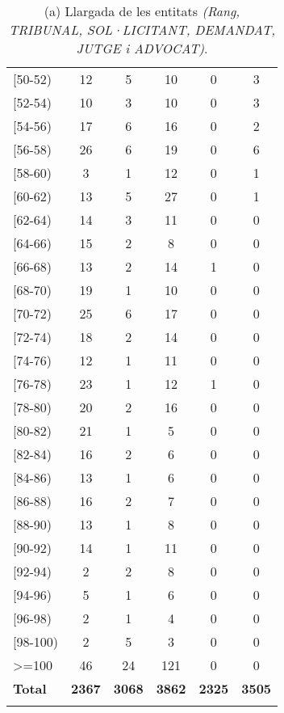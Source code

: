 \begin{table}[H]
\begin{tabular}{|l|ccccc}
  {[}50-52) & 12 & 5 & 10 & 0 & 3 \\
  {[}52-54) & 10 & 3 & 10 & 0 & 3 \\
  {[}54-56) & 17 & 6 & 16 & 0 & 2 \\
  {[}56-58) & 26 & 6 & 19 & 0 & 6 \\
  {[}58-60) & 3 & 1 & 12 & 0 & 1 \\
  {[}60-62) & 13 & 5 & 27 & 0 & 1 \\
  {[}62-64) & 14 & 3 & 11 & 0 & 0 \\
  {[}64-66) & 15 & 2 & 8 & 0 & 0 \\
  {[}66-68) & 13 & 2 & 14 & 1 & 0 \\
  {[}68-70) & 19 & 1 & 10 & 0 & 0 \\
  {[}70-72) & 25 & 6 & 17 & 0 & 0 \\
  {[}72-74) & 18 & 2 & 14 & 0 & 0 \\
  {[}74-76) & 12 & 1 & 11 & 0 & 0 \\
  {[}76-78) & 23 & 1 & 12 & 1 & 0 \\
  {[}78-80) & 20 & 2 & 16 & 0 & 0 \\
  {[}80-82) & 21 & 1 & 5 & 0 & 0 \\
  {[}82-84) & 16 & 2 & 6 & 0 & 0 \\
  {[}84-86) & 13 & 1 & 6 & 0 & 0 \\
  {[}86-88) & 16 & 2 & 7 & 0 & 0 \\
  {[}88-90) & 13 & 1 & 8 & 0 & 0 \\
  {[}90-92) & 14 & 1 & 11 & 0 & 0 \\
  {[}92-94) & 2 & 2 & 8 & 0 & 0 \\
  {[}94-96) & 5 & 1 & 6 & 0 & 0 \\
  {[}96-98) & 2 & 1 & 4 & 0 & 0 \\
  {[}98-100) & 2 & 5 & 3 & 0 & 0 \\
  \textgreater{}=100 & 46 & 24 & 121 & 0 & 0 \\
  \hline
  \textbf{Total} & \textbf{2367} & \textbf{3068} & \textbf{3862} & \textbf{2325} & \textbf{3505} \\
  \Xhline{2\arrayrulewidth}
  \end{tabular}
  \captionsetup{font=small}
  \caption*{(a) Llargada de les entitats \textit{(Rang, TRIBUNAL, SOL·LICITANT, DEMANDAT, JUTGE i ADVOCAT)}.}
\end{table}

